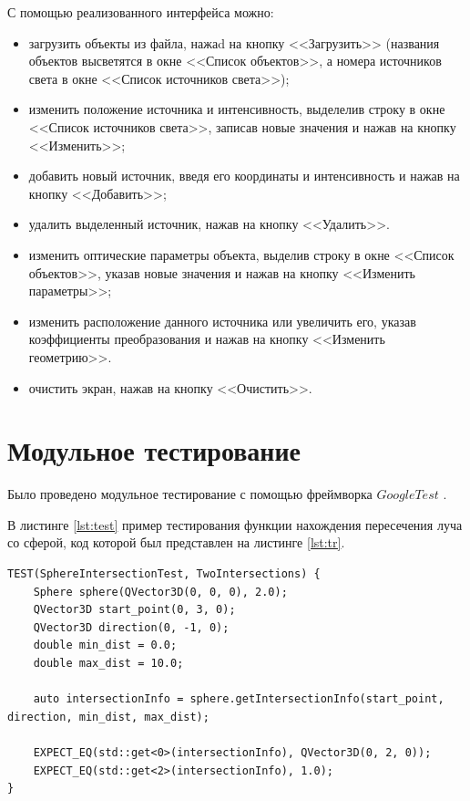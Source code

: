 С помощью реализованного интерфейса можно:

\begin{itemize}[label=---]
    \item загрузить объекты из файла, нажаd на кнопку <<Загрузить>> (названия объектов высветятся в окне <<Список объектов>>, а номера источников света в окне <<Список источников света>>);
    \item изменить положение источника и интенсивность, выделелив строку в окне <<Список источников света>>, записав новые значения и нажав на кнопку <<Изменить>>;
    \item добавить новый источник, введя его координаты и интенсивность и нажав на кнопку <<Добавить>>;
    \item удалить выделенный источник, нажав на кнопку <<Удалить>>.
    \item изменить оптические параметры объекта, выделив строку в окне <<Список объектов>>, указав новые значения и нажав на кнопку <<Изменить параметры>>;
    \item изменить расположение данного источника или увеличить его, указав коэффициенты преобразования и нажав на кнопку <<Изменить геометрию>>.
    \item очистить экран, нажав на кнопку <<Очистить>>.
\end{itemize}



\section{Модульное тестирование}

Было проведено модульное тестирование с помощью фреймворка $Google Test$ \cite{gtest}.

В листинге \ref{lst:test} пример тестирования функции нахождения пересечения луча со сферой, код которой был представлен на листинге \ref{lst:tr}.

\begin{center}
\captionsetup{justification=raggedright,singlelinecheck=off}
\begin{lstlisting}[label=lst:test,caption=Тест для функции нахождения пересечения луча со сферой,basicstyle=\ttfamily\footnotesize]
TEST(SphereIntersectionTest, TwoIntersections) {
    Sphere sphere(QVector3D(0, 0, 0), 2.0);
    QVector3D start_point(0, 3, 0);
    QVector3D direction(0, -1, 0);
    double min_dist = 0.0;
    double max_dist = 10.0;

    auto intersectionInfo = sphere.getIntersectionInfo(start_point, direction, min_dist, max_dist);

    EXPECT_EQ(std::get<0>(intersectionInfo), QVector3D(0, 2, 0));
    EXPECT_EQ(std::get<2>(intersectionInfo), 1.0);
}
\end{lstlisting}
\end{center}


